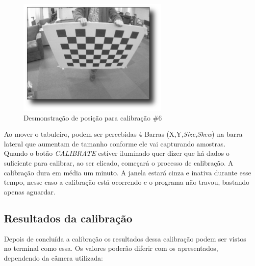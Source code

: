 \begin{figure}[!htb]
  \includegraphics[width=\linewidth]{Imagens/figura3-19.png}
  \caption{Desmonstração de posição para calibração \#6}\label{fig3:19}
\endminipage
\end{figure}

Ao mover o tabuleiro, podem ser percebidas 4 Barras (X,Y,\textit{Size},\textit{Skew}) na barra lateral que aumentam de tamanho conforme ele vai capturando amostras. Quando o botão \textit{CALIBRATE} estiver iluminado quer dizer que há dados o suficiente para calibrar, ao ser clicado, começará o processo de calibração.
A calibração dura em média um minuto. A janela estará cinza e inativa durante esse tempo, nesse caso a calibração está ocorrendo e o programa não travou, bastando apenas aguardar.

\subsection{Resultados da calibração}

Depois de concluída a calibração os resultados dessa calibração podem ser vistos no terminal como essa. Os valores poderão diferir com os apresentados, dependendo da câmera utilizada:


